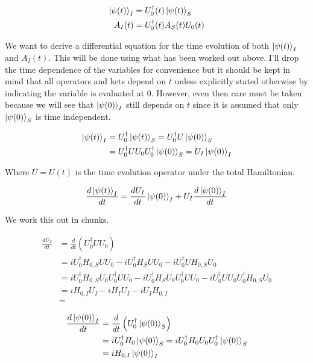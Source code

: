 \documentclass[12pt]{article}
\begin{document}
\begin{align}
\ket{\psi(t)}_I &= U_0^{\dag}(t) \ket{\psi(t)}_S\\
A_I(t) &= U_0^{\dag}(t) A_S(t) U_0(t)
\end{align}

We want to derive a differential equation for the time evolution of both $\ket{\psi(t)}_I$ and $A_I(t)$. This will be done using what has been worked out above. I'll drop the time dependence of the variables for convenience but it should be kept in mind that all operators and kets depend on $t$ unless explicitly stated otherwise by indicating the variable is evaluated at $0$. However, even then care must be taken because we will see that $\ket{\psi(0)}_I$ still depends on $t$ since it is assumed that only $\ket{\psi(0)}_S$ is time independent.

\begin{align}
\ket{\psi(t)}_I &= U_0^{\dag}\ket{\psi(t)}_S = U_0^{\dag}U\ket{\psi(0)}_S\\
&= U_0^{\dag} U U_0 U_0^{\dag} \ket{\psi(0)}_S = U_I \ket{\psi(0)}_I
\end{align}

Where $U=U(t)$ is the time evolution operator under the total Hamiltonian.

\begin{align}
\frac{d \ket{\psi(t)}_I}{d t} = \frac{d U_I}{d t} \ket{\psi(0)}_I + U_I \frac{d \ket{\psi(0)}_I}{d t}
\end{align}

We work this out in chunks.

\begin{align}
\frac{d{U_I}}{d t} &= \frac{d}{d t}(U_0^{\dag} U U_0)\\
&= iU_0^{\dag} H_{0,S} U U_0 - iU_0^{\dag} H_S U U_0 -iU_0^{\dag} U H_{0,S} U_0\\
&= iU_0^{\dag} H_{0,S} U_0 U_0^{\dag} U U_0 - iU_0^{\dag} H_SU_0 U_0^{\dag} U U_0 -iU_0^{\dag} U U_0 U_0^{\dag}H_{0,S} U_0\\
&= i H_{0,I} U_I - i H_I U_I - i U_I H_{0,I}\\
&= 
\end{align}

\begin{align}
\frac{d \ket{\psi(0)}_I}{d t} &= \frac{d}{d t} \left(U_0^{\dag} \ket{\psi(0)}_S\right)\\
&=i U_0^{\dag} H_0 \ket{\psi(0)}_S = i U_0^{\dag}H_0 U_0 U_0^{\dag} \ket{\psi(0)}_S\\
&= i H_{0,I} \ket{\psi(0)}_I
\end{align}
\end{document}
